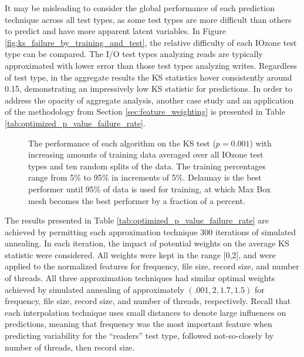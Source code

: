 \documentclass[letterpaper, 10 pt, conference]{ieeeconf}  %
\begin{document}
It may be misleading to consider the global performance of each prediction technique across all test types, as some test types are more difficult than others to predict and have more apparent latent variables. In Figure \ref{fig:ks_failure_by_training_and_test}, the relative difficulty of each IOzone test type can be compared. The I/O test types analyzing reads are typically approximated with lower error than those test types analyzing writes. Regardless of test type, in the aggregate results the KS statistics hover consistently around 0.15, demonstrating an impressively low KS statistic for predictions. In order to address the opacity of aggregate analysis, another case study and an application of the methodology from Section \ref{sec:feature_weighting} is presented in Table \ref{tab:optimized_p_value_failure_rate}.

\begin{figure}
  \caption{The performance of each algorithm on the KS test ($p=0.001$) with increasing amounts of training data averaged over all IOzone test types and ten random splits of the data. The training percentages range from 5\% to 95\% in increments of 5\%. Delaunay is the best performer until 95\% of data is used for training, at which Max Box mesh becomes the best performer by a fraction of a percent.
  \vspace{-.1cm}}
  \label{fig:ks_failure_by_training}
\end{figure}

The results presented in Table \ref{tab:optimized_p_value_failure_rate} are achieved by permitting each approximation technique 300 iterations of simulated annealing. In each iteration, the impact of potential weights on the average KS statistic were considered. All weights were kept in the range [0,2], and were applied to the normalized features for frequency, file size, record size, and number of threads. All three approximation techniques had similar optimal weights achieved by simulated annealing of approximately $(.001, 2, 1.7, 1.5)$ for frequency, file size, record size, and number of threads, respectively. Recall that each interpolation technique uses small distances to denote large influences on predictions, meaning that frequency was the most important feature when predicting variability for the ``readers'' test type, followed not-so-closely by number of threads, then record size.
\end{document}
